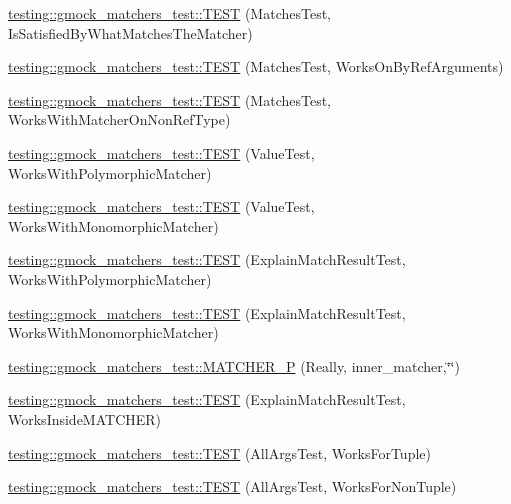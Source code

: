 \begin{DoxyCompactItemize}
\item 
\hyperlink{namespacetesting_1_1gmock__matchers__test_a6617484cbb644af9882fc5d853112aae}{testing\+::gmock\+\_\+matchers\+\_\+test\+::\+T\+E\+ST} (Matches\+Test, Is\+Satisfied\+By\+What\+Matches\+The\+Matcher)
\item 
\hyperlink{namespacetesting_1_1gmock__matchers__test_a6cfa391c9035262ccdc0d8f59e037b4d}{testing\+::gmock\+\_\+matchers\+\_\+test\+::\+T\+E\+ST} (Matches\+Test, Works\+On\+By\+Ref\+Arguments)
\item 
\hyperlink{namespacetesting_1_1gmock__matchers__test_a9fd734ae5afb64a7285503bc0870c255}{testing\+::gmock\+\_\+matchers\+\_\+test\+::\+T\+E\+ST} (Matches\+Test, Works\+With\+Matcher\+On\+Non\+Ref\+Type)
\item 
\hyperlink{namespacetesting_1_1gmock__matchers__test_a150118d4e990ba9fb9978329e742c931}{testing\+::gmock\+\_\+matchers\+\_\+test\+::\+T\+E\+ST} (Value\+Test, Works\+With\+Polymorphic\+Matcher)
\item 
\hyperlink{namespacetesting_1_1gmock__matchers__test_a53403682e9ffc12152b0b1c7f55dfa12}{testing\+::gmock\+\_\+matchers\+\_\+test\+::\+T\+E\+ST} (Value\+Test, Works\+With\+Monomorphic\+Matcher)
\item 
\hyperlink{namespacetesting_1_1gmock__matchers__test_a985e2bc1546b67de764d759de111e8e9}{testing\+::gmock\+\_\+matchers\+\_\+test\+::\+T\+E\+ST} (Explain\+Match\+Result\+Test, Works\+With\+Polymorphic\+Matcher)
\item 
\hyperlink{namespacetesting_1_1gmock__matchers__test_aeff2711a03b27a66c1c98ed97ff49b09}{testing\+::gmock\+\_\+matchers\+\_\+test\+::\+T\+E\+ST} (Explain\+Match\+Result\+Test, Works\+With\+Monomorphic\+Matcher)
\item 
\hyperlink{namespacetesting_1_1gmock__matchers__test_ae59dd69f7bc69e592dc851fef825d0ba}{testing\+::gmock\+\_\+matchers\+\_\+test\+::\+M\+A\+T\+C\+H\+E\+R\+\_\+P} (Really, inner\+\_\+matcher,\char`\"{}\char`\"{})
\item 
\hyperlink{namespacetesting_1_1gmock__matchers__test_ae57edef8890da6b929dd0d21c2f7c071}{testing\+::gmock\+\_\+matchers\+\_\+test\+::\+T\+E\+ST} (Explain\+Match\+Result\+Test, Works\+Inside\+M\+A\+T\+C\+H\+ER)
\item 
\hyperlink{namespacetesting_1_1gmock__matchers__test_aeea300647af4c7611f4e491cabcbf950}{testing\+::gmock\+\_\+matchers\+\_\+test\+::\+T\+E\+ST} (All\+Args\+Test, Works\+For\+Tuple)
\item 
\hyperlink{namespacetesting_1_1gmock__matchers__test_aacc3ed6d6a0f9ff552019d0d58817b6f}{testing\+::gmock\+\_\+matchers\+\_\+test\+::\+T\+E\+ST} (All\+Args\+Test, Works\+For\+Non\+Tuple)

\end{DoxyCompactItemize}
